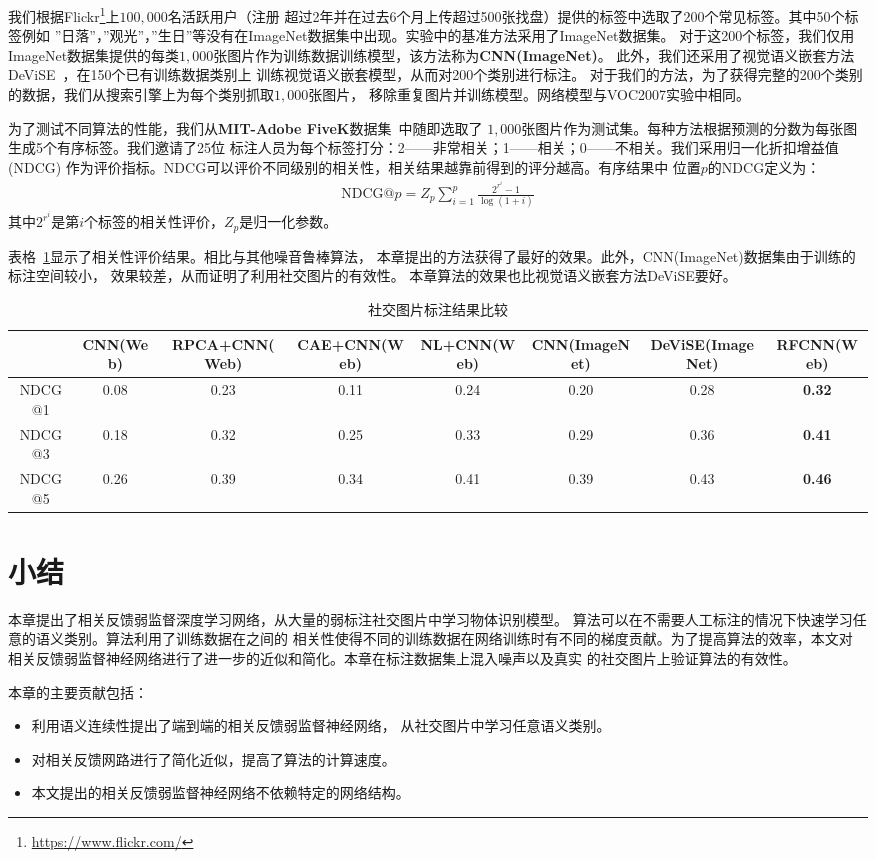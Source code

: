 我们根据Flickr\footnote{\url{https://www.flickr.com/}}上$100,000$名活跃用户（注册
超过2年并在过去6个月上传超过500张找盘）提供的标签中选取了200个常见标签。其中50个标签例如
''日落''，''观光''，''生日''等没有在ImageNet数据集中出现。实验中的基准方法采用了ImageNet数据集。
对于这200个标签，我们仅用ImageNet数据集提供的每类$1,000$张图片作为训练数据训练模型，该方法称为\textbf{CNN(ImageNet)}。
此外，我们还采用了视觉语义嵌套方法DeViSE~\cite{frome2013devise}，在150个已有训练数据类别上
训练视觉语义嵌套模型，从而对200个类别进行标注。
对于我们的方法，为了获得完整的200个类别的数据，我们从搜索引擎上为每个类别抓取$1,000$张图片，
移除重复图片并训练模型。网络模型与VOC2007实验中相同。

为了测试不同算法的性能，我们从\textbf{MIT-Adobe FiveK}数据集~\cite{fivek}中随即选取了
$1,000$张图片作为测试集。每种方法根据预测的分数为每张图生成5个有序标签。我们邀请了25位
标注人员为每个标签打分：2——非常相关；1——相关；0——不相关。我们采用归一化折扣增益值(NDCG)
作为评价指标。NDCG可以评价不同级别的相关性，相关结果越靠前得到的评分越高。有序结果中
位置$p$的NDCG定义为：
\begin{eqnarray}
    \text{NDCG}@p = Z_p \sum_{i=1}^p \frac{2^{r^i} - 1}{\log{(1+i)}}
\end{eqnarray}
其中$2^{r^i}$是第$i$个标签的相关性评价，$Z_p$是归一化参数。

表格~\ref{tab:rl-social-tagging-comp}显示了相关性评价结果。相比与其他噪音鲁棒算法，
本章提出的方法获得了最好的效果。此外，CNN(ImageNet)数据集由于训练的标注空间较小，
效果较差，从而证明了利用社交图片的有效性。
本章算法的效果也比视觉语义嵌套方法DeViSE要好。
\begin{table}[htbp]
\centering
\caption{社交图片标注结果比较} \label{tab:rl-social-tagging-comp}
\footnotesize
\tabcolsep=0.3mm
\begin{tabular}{|c|c|c|c|c|c|c|c|}
    \hline
    & CNN(Web) & RPCA+CNN(Web) & CAE+CNN(Web) & NL+CNN(Web) & CNN(ImageNet) &
    DeViSE(ImageNet) & RFCNN(Web)\\
    \hline
    NDCG@1 & 0.08 & 0.23 & 0.11 & 0.24 & 0.20 & 0.28 & \textbf{0.32}\\
    \hline
    NDCG@3 & 0.18 & 0.32 & 0.25 & 0.33 & 0.29 & 0.36 & \textbf{0.41}\\
    \hline
    NDCG@5 & 0.26 & 0.39 & 0.34 & 0.41 & 0.39 & 0.43 & \textbf{0.46}\\
    \hline
\end{tabular}
\end{table}

\section{小结}
本章提出了相关反馈弱监督深度学习网络，从大量的弱标注社交图片中学习物体识别模型。
算法可以在不需要人工标注的情况下快速学习任意的语义类别。算法利用了训练数据在之间的
相关性使得不同的训练数据在网络训练时有不同的梯度贡献。为了提高算法的效率，本文对
相关反馈弱监督神经网络进行了进一步的近似和简化。本章在标注数据集上混入噪声以及真实
的社交图片上验证算法的有效性。

本章的主要贡献包括：
\begin{itemize}
    \item 利用语义连续性提出了端到端的相关反馈弱监督神经网络，
        从社交图片中学习任意语义类别。
    \item 对相关反馈网路进行了简化近似，提高了算法的计算速度。
    \item 本文提出的相关反馈弱监督神经网络不依赖特定的网络结构。
\end{itemize}
